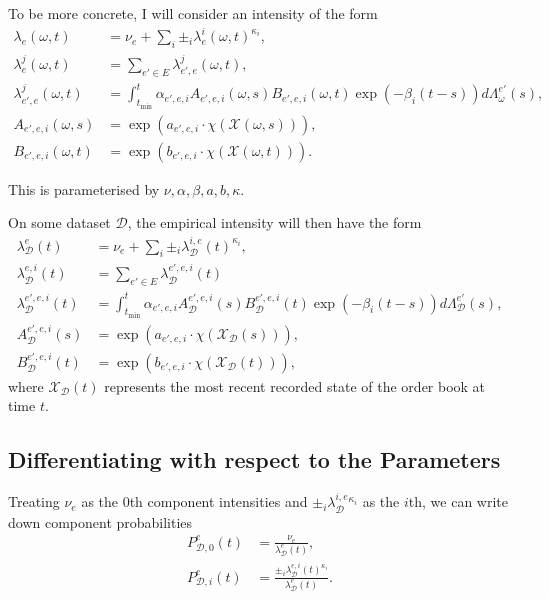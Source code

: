 \documentclass[honours,12pt]{unswthesis}
\numberwithin{equation}{section}
\begin{document}
To be more concrete, I will consider an intensity of the form
\begin{equation}
	\begin{align}
		\lambda_e(\omega,t) &= \nu_e + \sum_i \pm_i \lambda_e^i(\omega,t)^{\kappa_i}, \\
		\lambda_e^j(\omega,t) &= \sum_{e'\in E} \lambda_{e',e}^j(\omega,t), \\
		\lambda_{e',e}^j(\omega,t) &= \int_{t_\mathrm{min}}^t \alpha_{e',e,i} A_{e',e,i}(\omega,s) B_{e',e,i}(\omega,t)\exp(-\beta_i(t-s))d\Lambda_\omega^{e'}(s), \\
		A_{e',e,i}(\omega,s) &= \exp(a_{e',e,i}\cdot\chi(\mathcal{X}(\omega,s))), \\
		B_{e',e,i}(\omega,t) &= \exp(b_{e',e,i}\cdot\chi(\mathcal{X}(\omega,t))).
	\end{align}
\end{equation}

This is parameterised by $\nu,\alpha,\beta,a,b,\kappa$.

On some dataset $\mathcal{D}$, the empirical intensity will then have the form
\begin{equation}
	\begin{align}
		\lambda_\mathcal{D}^e(t) &= \nu_e + \sum_i \pm_i \lambda_\mathcal{D}^{i,e}(t)^{\kappa_i}, \\
		\lambda_\mathcal{D}^{e,i}(t) &= \sum_{e'\in E} \lambda_\mathcal{D}^{e',e,i}(t) \\
		\lambda_\mathcal{D}^{e',e,i}(t) &= \int_{t_\mathrm{min}}^t \alpha_{e',e,i} A_\mathcal{D}^{e',e,i}(s) B_\mathcal{D}^{e',e,i}(t)\exp(-\beta_i(t-s))d\Lambda_\mathcal{D}^{e'}(s), \\
		A_\mathcal{D}^{e',e,i}(s) &= \exp(a_{e',e,i}\cdot\chi(\mathcal{X}_\mathcal{D}(s))), \\
		B_\mathcal{D}^{e',e,i}(t) &= \exp(b_{e',e,i}\cdot\chi(\mathcal{X}_\mathcal{D}(t))),
	\end{align}
\end{equation}
where $\mathcal{X}_\mathcal{D}(t)$ represents the most recent recorded state of the order book at time $t$.

\subsection{Differentiating with respect to the Parameters}
Treating $\nu_e$ as the $0$th component intensities and $\pm_i \lambda_\mathcal{D}^{i,e}^{\kappa_i}$ as the $i$th, we can write down component probabilities
\begin{equation}
	\begin{align}
		P_{\mathcal{D},0}^e(t) &= \frac{\nu_e}{\lambda_\mathcal{D}^e(t)}, \\
		P_{\mathcal{D},i}^e(t) &= \frac{\pm_i \lambda_\mathcal{D}^{e,i}(t)^{\kappa_i}}{\lambda_\mathcal{D}^e(t)}.
	\end{align}
\end{equation}
\end{document}
